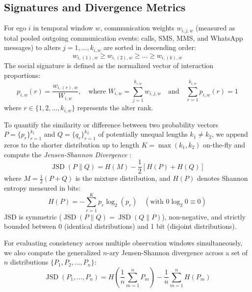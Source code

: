 \documentclass[11pt,letterpaper]{article}
\newcommand{\JSD}{\operatorname{JSD}}
\begin{document}
\subsection{Signatures and Divergence Metrics}
For ego $i$ in temporal window $w$, communication weights $w_{i,j,w}$ (measured as total pooled outgoing communication events: calls, SMS, MMS, and WhatsApp messages) to alters $j = 1, \dots, k_{i,w}$ are sorted in descending order:
\begin{equation}
w_{i,(1),w} \ge w_{i,(2),w} \ge \dots \ge w_{i,(k),w}
\end{equation}
The social signature is defined as the normalized vector of interaction proportions:
\begin{equation}
p_{i,w}(r) = \frac{w_{i,(r),w}}{W_{i,w}}, \quad \text{where } W_{i,w} = \sum_{j=1}^{k_{i,w}} w_{i,j,w} \quad \text{and} \quad \sum_{r=1}^{k_{i,w}} p_{i,w}(r) = 1
\end{equation}
where $r \in \{1, 2, \dots, k_{i,w}\}$ represents the alter rank.

To quantify the similarity or difference between two probability vectors $P = \{p_r\}_{r=1}^{k_1}$ and $Q = \{q_r\}_{r=1}^{k_2}$ of potentially unequal lengths $k_1 \neq k_2$, we append zeros to the shorter distribution up to length $K = \max(k_1, k_2)$ on-the-fly and compute the \textit{Jensen-Shannon Divergence} \citep[JSD;][]{lin1991divergence}:
\begin{equation}
\JSD(P \parallel Q) = H(M) - \frac{1}{2}\left[H(P) + H(Q)\right]
\end{equation}
where $M = \frac{1}{2}(P + Q)$ is the mixture distribution, and $H(P)$ denotes Shannon entropy measured in bits:
\begin{equation}
H(P) = -\sum_{r=1}^{K} p_r \log_2(p_r) \quad (\text{with } 0 \log_2 0 \equiv 0)
\end{equation}
JSD is symmetric ($\JSD(P \parallel Q) = \JSD(Q \parallel P)$), non-negative, and strictly bounded between 0 (identical distributions) and 1 bit (disjoint distributions).

For evaluating consistency across multiple observation windows simultaneously, we also compute the generalized $n$-ary Jensen-Shannon divergence across a set of $n$ distributions $\{P_1, P_2, \dots, P_n\}$:
\begin{equation}
\JSD(P_1, \dots, P_n) = H\left(\frac{1}{n}\sum_{m=1}^n P_m\right) - \frac{1}{n}\sum_{m=1}^n H(P_m)
\end{equation}
\end{document}
